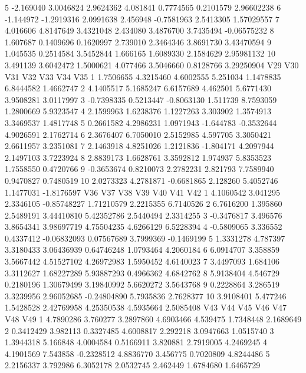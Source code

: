 \documentclass[12pt]{article}
\begin{document}
\begin{Schunk}
\begin{Soutput}
5  -2.169040  3.0046824 2.9624362  4.081841  0.7774565 0.2101579  2.96602238
6  -1.144972 -1.2919316 2.0991638  2.456948 -0.7581963 2.5413305  1.57029557
7   4.016606  4.8147649 3.4321048  2.434080  3.4876700 3.7435494 -0.06575232
8   1.607687  0.1409696 0.1620997  2.739010  2.3464346 3.8691730  3.43470594
9   1.045535  0.2514584 3.5452844  1.666165  1.6089330 2.1584629  2.95981132
10  3.491139  3.6042472 1.5000621  4.077466  3.5046660 0.8128766  3.29250904
          V29       V30        V31       V32        V33       V34        V35
1   1.7506655 4.3215460  4.6002555  5.251034  1.1478835 6.8444582  1.4662747
2   4.1405517 5.1685247  6.6157689  4.462501  5.6771430 3.9508281  3.0117997
3  -0.7398335 0.5213447 -0.8063130  1.511739  8.7593059 1.2800669  5.9323547
4   2.1599963 1.6238376  1.1227263  3.303902  1.3574913 3.3469537  1.4817748
5   0.2661582 4.2986231  1.0971943 -1.644783 -0.3532644 4.9026591  2.1762714
6   2.3676407 6.7050010  2.5152985  4.597705  3.3050421 2.6611957  3.2351081
7   2.1463918 4.8251026  1.2121836 -1.804171  4.2097944 2.1497103  3.7223924
8   2.8839173 1.6628761  3.3592812  1.974937  5.8353523 1.7558550  0.4720766
9  -0.3653674 0.8210073  2.2782231  2.821793  7.7589940 0.9470827  0.7480519
10  2.0273323 4.2781871 -0.6681865  2.128260  5.4052746 1.1477031 -1.8176597
          V36      V37       V38         V39         V40       V41        V42
1   4.1060542 3.041295 2.3346105 -0.85748227  1.71210579 2.2215355  6.7140526
2   6.7616200 1.395860 2.5489191  3.44410810  5.42352786 2.5440494  2.3314255
3  -0.3476817 3.496576 3.8654341  3.98697719  4.75504235 4.6266129  6.5228394
4  -0.5809065 3.336552 0.4337412 -0.06832093  0.07567689 3.7999369 -0.1469199
5   1.3331278 4.787397 3.3180433  3.06436939  0.64746248 1.0793464  4.2060184
6   6.0914707 3.358859 3.5667442  4.51527102  4.26972983 1.5950452  4.6140023
7   3.4497093 1.684106 3.3112627  1.68227289  5.93887293 0.4966362  4.6842762
8   5.9138404 4.546729 0.2180196  1.30679499  3.19840992 5.6620272  3.5643768
9   0.2228864 3.286519 3.3239956  2.96052685 -0.24804890 5.7935836  2.7628377
10  3.9108401 5.477246 1.5428528  2.42769958  4.25350538 4.5935664  2.5085408
         V43       V44        V45        V46      V47        V48       V49
1  4.7890286  3.760277  3.2897860  4.6903466 4.539475  1.7348448 2.1689649
2  0.3412429  3.982113  0.3327485  4.6008817 2.292218  3.0947663 1.0515740
3  1.3944318  5.166848  4.0004584  0.5166911 3.820881  2.7919005 4.2469245
4  4.1901569  7.543858 -0.2328512  4.8836770 3.456775  0.7020809 4.8244486
5  2.2156337  3.792986  6.3052178  2.0532745 2.462449  1.6784680 1.6465729

\end{Soutput}
\end{Schunk}
\end{document}
